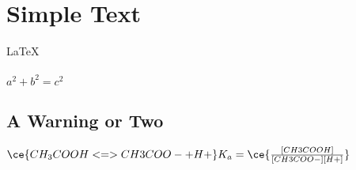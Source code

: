 \documentclass{article}
\begin{document}
 
 
\section{Simple Text}          %
\LaTeX \,\\ \\
 $a^2+b^2=c^2$


\subsection{A Warning or Two}  
$\ce{CH_3COOH<=> CH3COO- +H+}\\
K_a=\ce{\frac{[CH3COOH]}{[CH3COO-][H+]}}$
\end{document}
